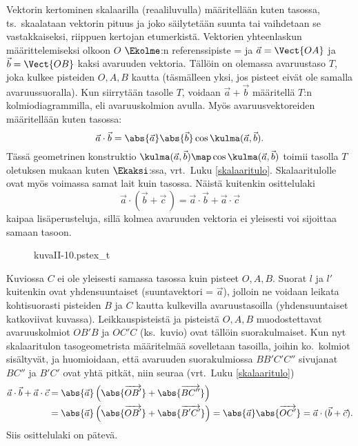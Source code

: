 Vektorin kertominen skalaarilla (reaaliluvulla) määritellään kuten tasossa, ts.\ skaalataan
vektorin pituus ja joko säilytetään suunta tai vaihdetaan se vastakkaiseksi, riippuen kertojan
etumerkistä. Vektorien yhteenlaskun määrittelemiseksi olkoon $O$ $\Ekolme$:n referenssipiste = 
%
 ja $\vec a=\Vect{OA}$ ja $\vec b=\Vect{OB}$ kaksi avaruuden vektoria. Tällöin on
olemassa avaruustaso $T$, joka kulkee pisteiden $O,A,B$ kautta (täsmälleen yksi, jos pisteet 
eivät ole samalla avaruussuoralla). Kun siirrytään tasolle $T$, voidaan $\vec a+\vec b$ 
määritellä $T$:n kolmiodiagrammilla, eli avaruuskolmion avulla. Myös avaruusvektoreiden
%
 määritellään kuten tasossa:
\[
\vec a \cdot \vec b = \abs{\vec a} \abs{\vec b} \cos \kulma(\vec a, \vec b).
\]
Tässä geometrinen konstruktio $\kulma(\vec a, \vec b)\map\cos\kulma(\vec a,\vec b)$ toimii
tasolla $T$ oletuksen mukaan kuten $\Ekaksi$:ssa, vrt.\ Luku \ref{skalaaritulo}. Skalaaritulolle
ovat myös voimassa samat lait kuin tasossa. Näistä kuitenkin osittelulaki
\[
\vec a \cdot (\vec b + \vec c\,) = \vec a \cdot \vec b + \vec a \cdot \vec c
\]
kaipaa lisäperusteluja, sillä kolmea avaruuden vektoria ei yleisesti voi sijoittaa samaan
tasoon.
\begin{figure}[H]
\begin{center}
{kuvaII-10.pstex_t}
\end{center}
\end{figure}
Kuviossa $C$ ei ole yleisesti samassa tasossa kuin pisteet $O,A,B$. Suorat $l$ ja $l'$ kuitenkin
ovat yhdensuuntaiset (suuntavektori = $\vec a$), jolloin ne voidaan leikata kohtisuorasti
pisteiden $B$ ja $C$ kautta kulkevilla avaruustasoilla (yhdensuuntaiset katkoviivat kuvassa).
Leikkauspisteistä ja pisteistä $O,A,B$ muodostettavat avaruuskolmiot $OB'B$ ja $OC'C$
(ks.\ kuvio) ovat tällöin suorakulmaiset. Kun nyt skalaaritulon tasogeometrista määritelmää 
sovelletaan tasoilla, joihin ko.\ kolmiot sisältyvät, ja huomioidaan, että avaruuden 
suorakulmiossa $BB'C'C''$ sivujanat $BC''$ ja $B'C'$ ovat yhtä pitkät, niin seuraa 
(vrt.\ Luku \ref{skalaaritulo})
\begin{align*}
\vec a \cdot \vec b + \vec a \cdot \vec c 
       &= \abs{\vec a}\left(\abs{\overrightarrow{OB'}} + \abs{\overrightarrow{BC''}}\right) \\
       &= \abs{\vec a}\left(\abs{\overrightarrow{OB'}} + \abs{\overrightarrow{B'C'}}\right)
          =\abs{\vec a}\abs{\overrightarrow{OC'}} = \vec a \cdot (\vec b + \vec c).
\end{align*}
Siis osittelulaki on pätevä.

